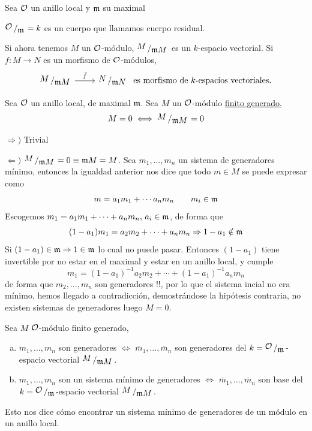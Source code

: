 Sea $\mathcal{O}$ un anillo local y $\mathfrak{m} $ su maximal 
\begin{defi}
    $\modulo{\mc O}{\m} = k$ es un cuerpo que llamamos cuerpo residual. 
\end{defi}
Si ahora tenemos $M$ un $\mathcal{O}$-m\'odulo, $\modulo{M}{\m M}$ es un $k$-espacio vectorial. Si $f:M \longrightarrow N$ es un morfismo de $\mathcal{O}$-m\'odulos, 
$$\bt \modulo{M}{\m M} \arrow{r}{\bar f} & \modulo{N}{\m N}  \et \text{ es morfismo de } k\text{-espacios vectoriales. }$$
\begin{lem}
    [de Nakayama] Sea $\mathcal{O}$ un anillo local, de maximal $\mathfrak{m}$. Sea $M$ un $\mathcal{O}$-m\'odulo \underline{finito generado}, 
    $$M=0 \iff \modulo{M}{\m M} = 0$$
\end{lem}
\begin{dem}
    $\Rightarrow)$ Trivial

    $\Leftarrow)$ $\modulo{M}{\m M} =0 \equiv \m M = M$. Sea $m_1, \ldots, m_n$ un sistema de generadores m\'inimo, entonces la igualdad anterior nos dice que todo $m \in M$ se puede expresar como
    $$m = a_1 m_1 + \cdots a_n m_n \qquad m_i \in \mathfrak{m}$$
    Escogemos $m_1=a_1m_1+\cdots+a_nm_n, \,a_i \in \mathfrak{m}$, de forma que
    $$(1-a_1)m_1=a_2m_2+\cdots+a_nm_n \Rightarrow 1-a_1\notin \mathfrak{m}$$
    Si $(1-a_1)\in \mathfrak{m} \Rightarrow 1\in \mathfrak{m}$ lo cual no puede pasar. Entonces $(1-a_1)$ tiene invertible por no estar en el maximal y estar en un anillo local, y cumple
    $$m_1 = (1-a_1)^{-1} a_2m_2 + \cdots + (1-a_1)^{-1} a_nm_n$$
    de forma que $m_2, \ldots, m_n$ son generadores !!, por lo que el sistema incial no era m\'inimo, hemos llegado a contradicci\'on, demostr\'andose la hip\'otesis contraria, no existen sistemas de generadores luego $M=0$.
\end{dem}
\begin{cor}
    Sea $M$ $\mathcal{O}$-m\'odulo finito generado, \vspace{-3mm}
    \begin{enumerate}[a)]
        \item  $m_1, \ldots, m_n$ son generadores $\iff$ $\bar m_1, \ldots, \bar m_n $ son generadores del $k=\modulo{\mc O}{\m}$-espacio vectorial $\modulo{M}{\m M}$. 

    \item $m_1, \ldots, m_n$ son un sistema m\'inimo de generadores $\iff$ $\bar m_1, \ldots, \bar m_n $ son base del $k=\modulo{\mc O}{\m}$-espacio vectorial $\modulo{M}{\m M}$. 

    \end{enumerate}
    Esto nos dice c\'omo encontrar un sistema m\'inimo de generadores de un m\'odulo en un anillo local.
\end{cor}
